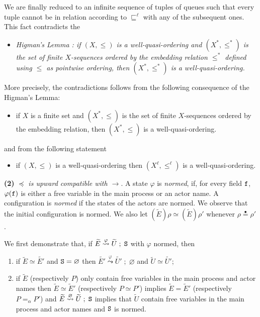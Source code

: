 \documentclass{LMCS}
\theoremstyle{plain}\newtheorem{proposition}[thm]{Proposition}
\theoremstyle{plain}\newtheorem{lemma}[thm]{Lemma}
\theoremstyle{plain}\newtheorem{theorem}[thm]{Theorem}
\theoremstyle{plain}\newtheorem{corollary}[thm]{Corollary}
\newcommand{\State}{{\tt S}}
\newcommand{\lred}[1]{\stackrel{#1}{\longrightarrow}}
\newcommand{\lleadsto}[1]{\stackrel{#1}{\leadsto}}
\newcommand{\f}{{\tt f}}
\newcommand{\wt}[1]{\widetilde{#1}}
\newcommand{\eqdot}{\stackrel{\bullet}{=}}
\begin{document}
We are finally reduced to an infinite sequence of tuples of queues 
such that every tuple cannot be in relation according to $\sqsubseteq^\ell$
with any of the subsequent ones.
This fact contradicts the 
\begin{itemize}
\item[] \emph{Higman's Lemma \cite{HigmanLemma}:
if $(X,\le)$ is a well-quasi-ordering and $(X^*, \le^*)$ is the set of finite 
$X$-sequences ordered by the embedding 
relation $\le^*$ defined using $\le$ as pointwise ordering, 
then $(X^*, \leq^*)$ is a  well-quasi-ordering.}
\end{itemize}
More precisely, the contradictions follows from the following
consequence of the Higman's Lemma:
\begin{itemize}
\item 
if $X$ is a finite set and $(X^*, \le)$ is the set of finite $X$-sequences 
ordered by the embedding 
relation, then $(X^*, \leq)$ is a  well-quasi-ordering.
\end{itemize}
and from the following statement
\begin{itemize}
\item 
if $(X,\leq)$ is a well-quasi-ordering then $(X^\ell, \leq^\ell)$ is a well-quasi-ordering.
\end{itemize}



\medskip

{\bf (2)} \emph{$\preceq$ is upward compatible with $\lred{}$}.
A state $\varphi$ is \emph{normed}, if, for every field $\f$, $\varphi(\f)$ is 
either a free variable in the main process or an actor name.
A configuration is \emph{normed} if the states of the actors are normed.
We observe that the initial configuration is 
 normed.
We also let $(\wt{E})\rho \simeq (\wt{E})\rho'$ whenever $\rho \eqdot \rho'$.

We first demonstrate that, if $\wt{E} \lleadsto{\varphi} \wt{U}\; ; \; \State$
with $\varphi$ normed, then

\begin{enumerate}[label=(exp-\roman*)]
\item if  $\wt{E} \simeq \wt{E'}$ and $\State = \varnothing$ then
$\wt{E'} \lleadsto{\varphi} \wt{U'}\; ; \; \varnothing$ and 
$\wt{U} \simeq \wt{U'}$;

\item if $\wt{E}$ (respectively $P$) only contain  free variables in the main process 
and actor names
then $\wt{E} \simeq \wt{E}'$ (respectively $P \simeq P'$) implies
$\wt{E} = \wt{E}'$ (respectively $P =_\alpha P'$) 
and $\wt{E}  \lleadsto{\varnothing} \wt{U}\; 
; \; \State$ implies that $\wt{U}$ contain  free variables in the main process and actor names and $\State$ is normed.
\end{enumerate}
\end{document}
